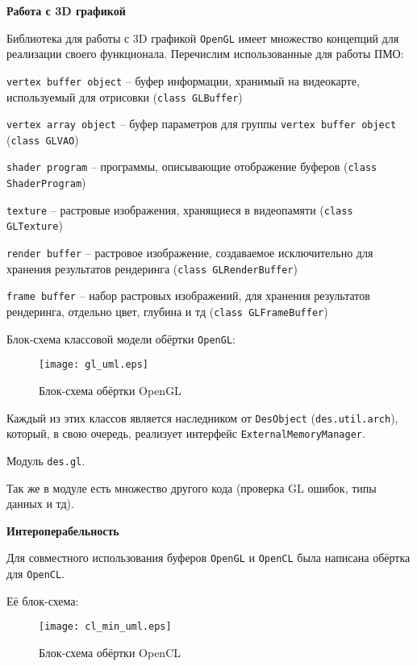 \newpage
\textbf{Работа с 3D графикой}

Библиотека для работы с 3D графикой \verb|OpenGL| имеет множество концепций для реализации
своего функционала. Перечислим использованные для работы ПМО:

\begin{mintemize}
\item \verb|vertex buffer object| -- буфер информации,
    хранимый на видеокарте, используемый для отрисовки
    (\verb|class GLBuffer|)
\item \verb|vertex array object| -- буфер параметров для
    группы \verb|vertex buffer object| (\verb|class GLVAO|)
\item \verb|shader program| -- программы, описывающие
    отображение буферов \linebreak (\verb|class ShaderProgram|)
\item \verb|texture| -- растровые изображения, хранящиеся
    в видеопамяти (\verb|class GLTexture|)
\item \verb|render buffer| -- растровое изображение, создаваемое
    исключительно для хранения результатов рендеринга
    (\verb|class GLRenderBuffer|)
\item \verb|frame buffer| -- набор растровых изображений,
    для хранения результатов рендеринга, отдельно цвет,
    глубина и тд (\verb|class GLFrameBuffer|)
\end{mintemize}

Блок-схема классовой модели обёртки \verb|OpenGL|:

\begin{figure}[h!]
    \centering
    \texttt{[image: gl\_uml.eps]}
    \caption{Блок-схема обёртки OpenGL}
\end{figure}

Каждый из этих классов является наследником от \verb|DesObject|
(\verb|des.util.arch|), который, в свою очередь, реализует интерфейс
\verb|ExternalMemoryManager|.

Модуль \verb|des.gl|.

Так же в модуле есть множество другого кода (проверка GL ошибок,
типы данных и тд).

\newpage
\textbf{Интероперабельность}

Для совместного использования буферов \verb|OpenGL| и \verb|OpenCL|
была написана обёртка для \verb|OpenCL|.

Её блок-схема:

\begin{figure}[h!]
    \centering
    \texttt{[image: cl\_min\_uml.eps]}
    \caption{Блок-схема обёртки OpenCL}
\end{figure}

